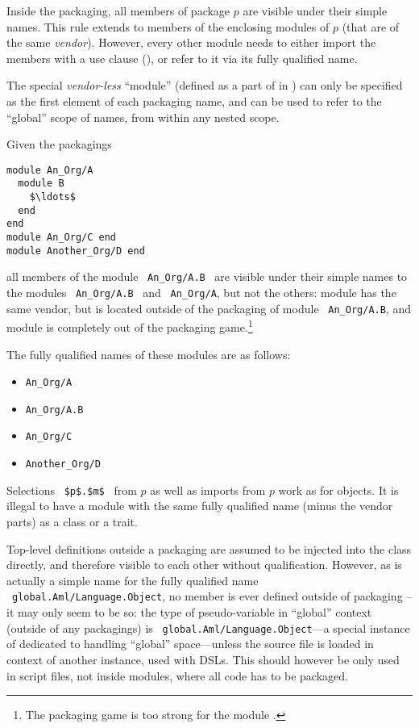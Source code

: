 Inside the packaging, all members of package $p$ are visible under their simple names. This rule extends to members of the enclosing modules of $p$ (that are of the same {\em vendor}). However, every other module needs to either import the members with a use clause (), or refer to it via its fully qualified name. 

The special {\em vendor-less}  ``module'' (defined as a part of  in ) can only be specified as the first element of each packaging name, and can be used to refer to the ``global'' scope of names, from within any nested scope.

\example Given the packagings
\begin{lstlisting}
module An_Org/A
  module B
    $\ldots$
  end
end
module An_Org/C end
module Another_Org/D end
\end{lstlisting}
all members of the module ~\lstinline!An_Org/A.B!~ are visible under their simple names to the modules ~\lstinline!An_Org/A.B!~ and ~\lstinline!An_Org/A!, but not the others: module  has the same vendor, but is located outside of the packaging of module ~\lstinline!An_Org/A.B!, and module  is completely out of the packaging game.\footnote{The packaging game is too strong for the module .} 

The fully qualified names of these modules are as follows: 
\begin{itemize}
\item \lstinline!An_Org/A!
\item \lstinline!An_Org/A.B!
\item \lstinline!An_Org/C!
\item \lstinline!Another_Org/D!
\end{itemize}


Selections ~\lstinline!$p$.$m$!~ from $p$ as well as imports from $p$ work as for objects. It is illegal to have a module with the same fully qualified name (minus the vendor parts) as a class or a trait. 

Top-level definitions outside a packaging are assumed to be injected into the  class directly, and therefore visible to each other without qualification. However, as  is actually a simple name for the fully qualified name ~\lstinline!global.Aml/Language.Object!, no member is ever defined outside of packaging -- it may only seem to be so: the type of  pseudo-variable in ``global'' context (outside of any packagings) is ~\lstinline!global.Aml/Language.Object!---a special instance of  dedicated to handling ``global'' space---unless the source file is loaded in context of another instance, used with DSLs. This should however be only used in script files, not inside modules, where all code has to be packaged. 










